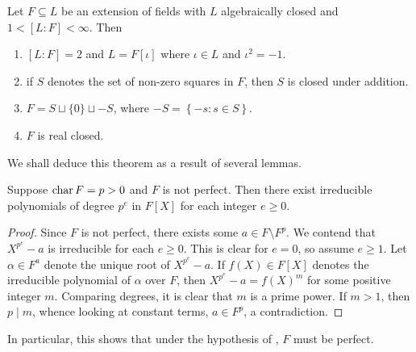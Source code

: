 \begin{theorem}
    Let $F\subseteq L$ be an extension of fields with $L$ algebraically closed and $1 < [L : F] < \infty$. Then 
    \begin{enumerate}[label=(\arabic*)]
        \item $[L : F] = 2$ and $L = F[\iota]$ where $\iota\in L$ and $\iota^2 = -1$.\label{artin-schreier-first-part}
        \item if $S$ denotes the set of non-zero squares in $F$, then $S$ is closed under addition. \label{artin-schreier-second-part}
        \item $F = S\sqcup\{0\}\sqcup -S$, where $-S = \left\{-s\colon s\in S\right\}$. \label{artin-schreier-third-part}
        \item $F$ is real closed. \label{artin-schreier-fourth-part}
    \end{enumerate}
\end{theorem}

We shall deduce this theorem as a result of several lemmas. 

\begin{lemma}
    Suppose $\operatorname{char} F = p > 0$ and $F$ is not perfect. Then there exist irreducible polynomials of degree $p^e$ in $F[X]$ for each integer $e\ge 0$.
\end{lemma}
\begin{proof}
    Since $F$ is not perfect, there exists some $a\in F\setminus F^p$. We contend that $X^{p^e} - a$ is irreducible for each $e\ge 0$. This is clear for $e = 0$, so assume $e\ge 1$. Let $\alpha\in F^a$ denote the unique root of $X^{p^e} - a$. If $f(X)\in F[X]$ denotes the irreducible polynomial of $\alpha$ over $F$, then $X^{p^e} - a = f(X)^m$ for some positive integer $m$. Comparing degrees, it is clear that $m$ is a prime power. If $m > 1$, then $p\mid m$, whence looking at constant terms, $a\in F^p$, a contradiction.
\end{proof}

In particular, this shows that under the hypothesis of , $F$ must be perfect.

